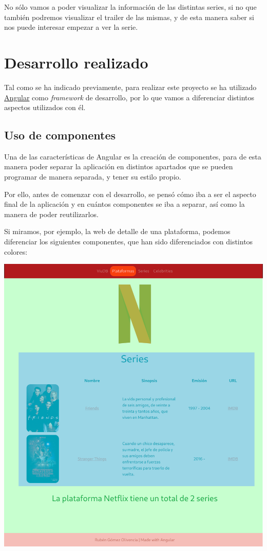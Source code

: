 \documentclass{\ClassPath/viu-tfm-template}
\begin{document}
No sólo vamos a poder visualizar la información de las distintas series, si no que también podremos visualizar el trailer de las mismas, y de esta manera saber si nos puede interesar empezar a ver la serie.

\chapter{Desarrollo realizado}
Tal como se ha indicado previamente, para realizar este proyecto se ha utilizado \href{https://angular.io/}{Angular} como \textit{framework} de desarrollo, por lo que vamos a diferenciar distintos aspectos utilizados con él.

\section{Uso de componentes}
Una de las características de Angular es la creación de componentes, para de esta manera poder separar la aplicación en distintos apartados que se pueden programar de manera separada, y tener su estilo propio.

Por ello, antes de comenzar con el desarrollo, se pensó cómo iba a ser el aspecto final de la aplicación y en cuántos componentes se iba a separar, así como la manera de poder reutilizarlos.

Si miramos, por ejemplo, la web de detalle de una plataforma, podemos diferenciar los siguientes componentes, que han sido diferenciados con distintos colores:

\vspace{-1em}
\begin{center}
    \includegraphics[frame,width=0.6\linewidth]{img/componentes.png}
\end{center}
\end{document}
